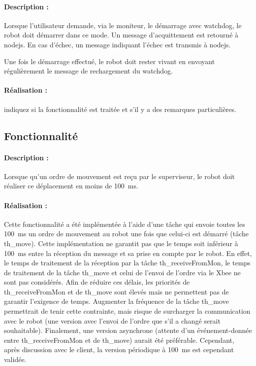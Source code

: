 \documentclass[11pt, a4paper]{paper}
\newcounter{cptreq}
\begin{document}
\paragraph{Description :} Lorsque l'utilisateur demande, via le moniteur, le démarrage avec watchdog, le robot doit démarrer dans ce mode. Un message d'acquittement est retourné à nodejs. En cas d'échec, un message indiquant l'échec est transmis à nodejs.

Une fois le démarrage effectué, le robot doit rester vivant en envoyant régulièrement le message de rechargement du watchdog.

\paragraph{\color{black}Réalisation :}  {\color{red} indiquez si la fonctionnalité est traitée et s'il y a des remarques particulières.}

{\color{gray}
\subsection{Fonctionnalité \thecptreq *}

\paragraph{Description :} Lorsque qu'un ordre de mouvement est reçu par le superviseur, le robot doit réaliser ce déplacement en moins de 100~ms.

\paragraph{\color{black}Réalisation :}  {\color{blue} Cette fonctionnalité a été implémentée à l'aide d'une tâche qui envoie toutes les 100~ms un ordre de mouvement au robot une fois que celui-ci est démarré (tâche th\_move). Cette implémentation ne garantit pas que le temps soit inférieur à 100~ms entre la réception du message et sa prise en compte par le robot. En effet, le temps de traitement de la réception par la tâche th\_receiveFromMon, le temps de traitement de la tâche th\_move et celui de l'envoi de l'ordre via le Xbee ne sont pas considérés. Afin de réduire ces délais, les priorités de  th\_receiveFromMon et de th\_move sont élevés mais ne permettent pas de garantir l'exigence de temps. Augmenter la fréquence de la tâche th\_move permettrait de tenir cette contrainte, mais risque de surcharger la communication avec le robot (une version avec l'envoi de l'ordre que s'il a changé serait souhaitable). Finalement, une version asynchrone (attente d'un événement-donnée entre th\_receiveFromMon et de th\_move) aurait été préférable. Cependant, après discussion avec le client, la version périodique à 100~ms est cependant validée.}
}
\end{document}
